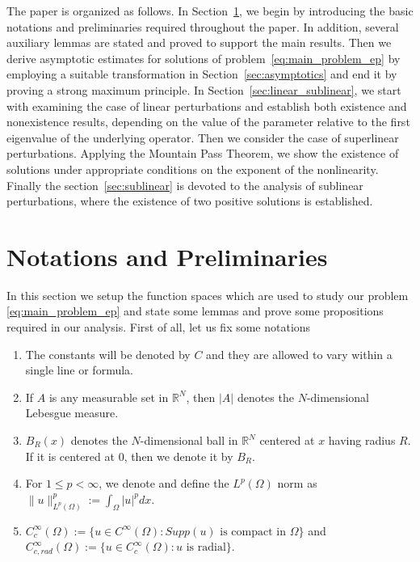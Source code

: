 \documentclass[11pt]{article}
\newcommand{\om} {\Omega}
\newcommand{\rnn}{\mathbb{R}^{N}}
\newcommand{\lv}{\lVert}
\newcommand{\rv}{\rVert}
\begin{document}
The paper is organized as follows. In Section~\ref{sec:notations}, we begin by introducing the basic notations and preliminaries required throughout the paper. In addition, several auxiliary lemmas are stated and proved to support the main results. Then we derive asymptotic estimates for solutions of problem~\eqref{eq:main_problem_ep} by employing a suitable transformation in Section~\ref{sec:asymptotics} and end it by proving a strong maximum principle. 
In Section~\ref{sec:linear_sublinear}, we start with examining the case of linear perturbations and establish both existence and nonexistence results, depending on the value of the parameter relative to the first eigenvalue of the underlying operator. Then we consider the case of superlinear perturbations. Applying the Mountain Pass Theorem, we show the existence of solutions under appropriate conditions on the exponent of the nonlinearity. Finally the section~\ref{sec:sublinear} is devoted to the analysis of sublinear perturbations, where the existence of two positive solutions is established. 



\section{Notations and Preliminaries}\label{sec:notations}

In this section we setup the function spaces which are used to study our problem \eqref{eq:main_problem_ep} and state some lemmas and prove some propositions required in our analysis. First of all, let us fix some notations
\begin{enumerate}
    \item[$(i)$] The constants will be denoted by $C$ and they are allowed to vary within a single line or formula. 
    \item[$(ii)$] If $A$ is any measurable set in $\rnn$, then $|A|$ denotes the $N$-dimensional Lebesgue measure.
    \item[$(iii)$] $B_R(x)$ denotes the $N$-dimensional ball in $\rnn$ centered at $x$ having radius $R$. If it is centered at $0$, then we denote it by $B_R$.
    \item[$(iv)$] For $1 \leq p < \infty$, we denote and define the $L^p(\om)$ norm as $\lv u \rv_{L^p(\om)}^p := \int_{\om} |u|^p dx$.
    \item[$(v)$] $C_c^\infty(\om):= \{ u \in C^{\infty}(\om) : Supp(u) \text{ is compact in } \om \}$ and $C_{c,rad}^\infty(\om) := \{ u \in C_c^\infty(\om) : u \text{ is radial}\}$.
\end{enumerate}
\end{document}
